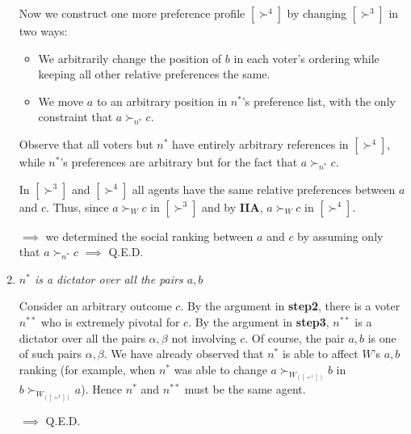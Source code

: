 \begin{enumerate}
	\noindent Now we construct one more preference profile $[\succ^4]$ by 
	changing $[\succ^3]$ in two ways:
	\begin{itemize}
		\item We arbitrarily change the position of $b$ in each voter's ordering 
		while keeping all other relative preferences the same.
		\item We move $a$ to an arbitrary position in $n^*$'s preference list, 
		with the only constraint that $a \succ_{n^*} c$.
	\end{itemize}
	Observe that all voters but $n^*$ have entirely arbitrary references in 
	$[\succ^4]$, while $n^*$'s preferences are arbitrary but for the fact that 
	$a \succ_{n^*} c$.

	\noindent In $[\succ^3]$ and $[\succ^4]$ all agents have the same relative 
	preferences between $a$ and $c$. Thus, since $a \succ_W c$ in $[\succ^3]$ 
	and by \textbf{IIA}, $a \succ_W c$ in $[\succ^4]$. 

	\noindent $\implies$ we determined the social ranking between $a$ and $c$ 
	by assuming only that $a \succ_{n^*} c$ $\implies$ Q.E.D.

	\item \textit{$n^*$ is a dictator over all the pairs $a,b$}

	\noindent Consider an arbitrary outcome $c$. By the argument in 
	\textbf{step2}, there is a voter $n^{**}$ who is extremely pivotal for $c$. 
	By the argument in \textbf{step3}, $n^{**}$ is a dictator over all the pairs 
	$\alpha,\beta$ not involving $c$. Of course, the pair $a,b$ is one of such 
	pairs $\alpha,\beta$. We have already observed that $n^*$ is able to affect 
	$W$'s $a,b$ ranking (for example, when $n^*$ was able to change 
	$a \succ_{W_{([\succ^1])}} b$ in $b \succ_{W_{([\succ^2])}} a$). Hence $n^*$ and 
	$n^{**}$ must be the same agent.

	\noindent $\implies$ Q.E.D.
\end{enumerate}

%
